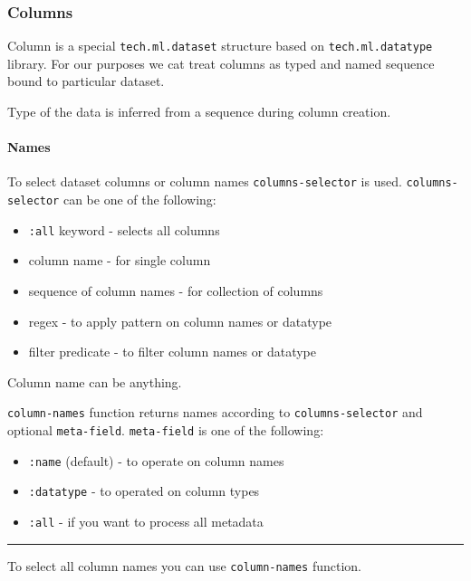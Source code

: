 \documentclass[]{article}
\providecommand{\tightlist}{%
  \setlength{\itemsep}{0pt}\setlength{\parskip}{0pt}}
\let\oldparagraph\paragraph
\renewcommand{\paragraph}[1]{\oldparagraph{#1}\mbox{}}
\begin{document}
\subsubsection{Columns}\label{columns}

Column is a special \texttt{tech.ml.dataset} structure based on
\texttt{tech.ml.datatype} library. For our purposes we cat treat columns
as typed and named sequence bound to particular dataset.

Type of the data is inferred from a sequence during column creation.

\paragraph{Names}\label{names}

To select dataset columns or column names \texttt{columns-selector} is
used. \texttt{columns-selector} can be one of the following:

\begin{itemize}
\tightlist
\item
  \texttt{:all} keyword - selects all columns
\item
  column name - for single column
\item
  sequence of column names - for collection of columns
\item
  regex - to apply pattern on column names or datatype
\item
  filter predicate - to filter column names or datatype
\end{itemize}

Column name can be anything.

\texttt{column-names} function returns names according to
\texttt{columns-selector} and optional \texttt{meta-field}.
\texttt{meta-field} is one of the following:

\begin{itemize}
\tightlist
\item
  \texttt{:name} (default) - to operate on column names
\item
  \texttt{:datatype} - to operated on column types
\item
  \texttt{:all} - if you want to process all metadata
\end{itemize}

\begin{center}\rule{0.5\linewidth}{0.5pt}\end{center}

To select all column names you can use \texttt{column-names} function.
\end{document}

